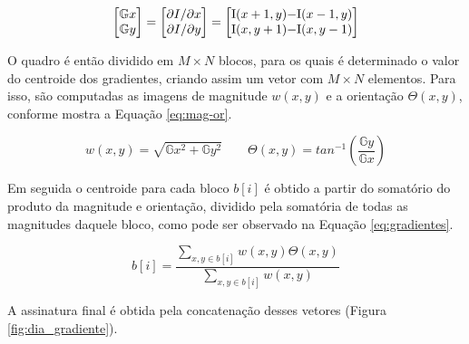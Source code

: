 \begin{equation}
  \label{eq:gmatrix}
  \begin{bmatrix}
    \mathbb{G}x
    \\ 
    \mathbb{G}y
  \end{bmatrix}= 
  \begin{bmatrix}
    \partial I/\partial x
    \\ 
    \partial I/\partial y
  \end{bmatrix}=
  \begin{bmatrix}
    $I$(x+1, y) - $I$(x-1,y)
    \\ 
    $I$(x, y+1) - $I$(x,y-1)
  \end{bmatrix}
\end{equation}
    
	O quadro é então dividido em $M\times N$ blocos, para os quais é determinado o valor do centroide dos gradientes, criando assim um vetor com $M \times N$ elementos. Para isso, são computadas as imagens de magnitude \textit{$w(x,y)$} e a orientação \textit{$\Theta(x,y)$}, conforme mostra a Equação \ref{eq:mag-or}.
    
\begin{equation}
	\label{eq:mag-or}
    w(x,y) = \sqrt{\mathbb{G}x^{2} + \mathbb{G}y^{2}}
\qquad
\Theta(x,y) = tan^{-1}\left (\frac{\mathbb{G}y}{\mathbb{G}x} \right)
\end{equation}
    
    Em seguida o centroide para cada bloco $b[i]$ é obtido a partir do somatório do produto da magnitude e orientação, dividido pela somatória de todas as magnitudes daquele bloco, como pode ser observado na Equação \ref{eq:gradientes}.
    
    
\begin{equation}
	\label{eq:gradientes}
	b[i] = \frac{\sum_{x,y \in b[i]} w(x,y)\Theta (x,y)}{\sum_{x,y \in b[i]} w(x,y)}
\end{equation}

A assinatura final é obtida pela concatenação desses vetores (Figura \ref{fig:dia_gradiente}).

